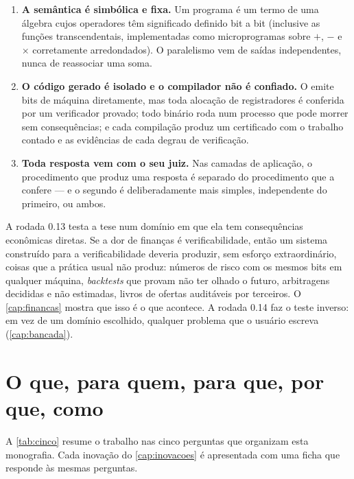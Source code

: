 \begin{enumerate}
  \item \textbf{A semântica é simbólica e fixa.} Um programa é um termo de uma álgebra cujos operadores têm significado definido bit a bit (inclusive as funções transcendentais, implementadas como microprogramas sobre $+$, $-$ e $\times$ corretamente arredondados). O paralelismo vem de saídas independentes, nunca de reassociar uma soma.
  \item \textbf{O código gerado é isolado e o compilador não é confiado.} O \vapor{} emite bits de máquina diretamente, mas toda alocação de registradores é conferida por um verificador provado; todo binário roda num processo que pode morrer sem consequências; e cada compilação produz um certificado com o trabalho contado e as evidências de cada degrau de verificação.
  \item \textbf{Toda resposta vem com o seu juiz.} Nas camadas de aplicação, o procedimento que produz uma resposta é separado do procedimento que a confere --- e o segundo é deliberadamente mais simples, independente do primeiro, ou ambos.
\end{enumerate}

A rodada 0.13 testa a tese num domínio em que ela tem consequências econômicas diretas. Se a dor de finanças é verificabilidade, então um sistema construído para a verificabilidade deveria produzir, sem esforço extraordinário, coisas que a prática usual não produz: números de risco com os mesmos bits em qualquer máquina, \textit{backtests} que provam não ter olhado o futuro, arbitragens decididas e não estimadas, livros de ofertas auditáveis por terceiros. O \autoref{cap:financas} mostra que isso é o que acontece. A rodada 0.14 faz o teste inverso: em vez de um domínio escolhido, qualquer problema que o usuário escreva (\autoref{cap:bancada}).

\section{O que, para quem, para que, por que, como}\label{sec:cinco}

A \autoref{tab:cinco} resume o trabalho nas cinco perguntas que organizam esta monografia. Cada inovação do \autoref{cap:inovacoes} é apresentada com uma ficha que responde às mesmas perguntas.

